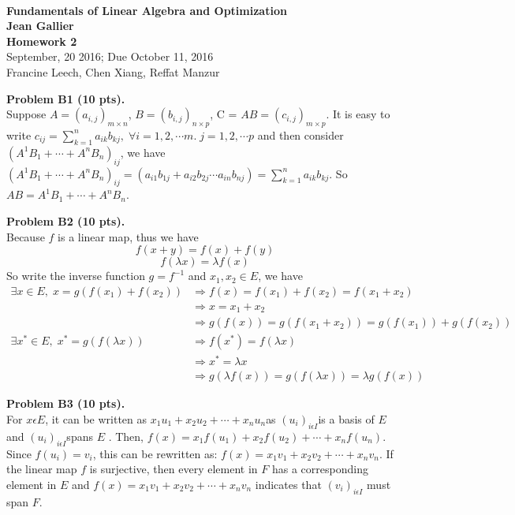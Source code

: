 \documentclass[12pt]{article}
\begin{document}
\begin{center}
\\
\vspace{1cm}
{\Large\bf Fundamentals of Linear Algebra and Optimization\\
Jean Gallier \\
\vspace{0.5cm}
Homework 2}\\[10pt]
September, 20 2016; Due October 11, 2016\\
Francine Leech, Chen Xiang, Reffat Manzur
\end{center}


\vspace {0.25cm}\noindent
{\bf Problem B1 (10 pts).} \\
Suppose $A = (a_{i,j})_{m \times n}$, $B = (b_{i,j})_{n \times p}$, C = $AB = (c_{i,j})_{m \times p}$.
It is easy to write $c_{ij} = \sum_{k=1}^{n} a_{ik} b_{kj},\; \forall i = 1,2,\cdots m.\; j = 1,2,\cdots p$ 
and then consider $(A^1B_1 + \cdots + A^nB_n)_{ij}$, we have $  (A^1B_1 + \cdots + A^nB_n)_{ij} = (a_{i1}b_{1j} + a_{i2}b_{2j} \cdots a_{in}b_{nj}) = \sum_{k=1}^{n} a_{ik} b_{kj}$. So $AB = A^1B_1 + \cdots + A^nB_n$.


\vspace {0.25cm}\noindent
{\bf Problem B2 (10 pts).} \\
Because $f$ is a linear map, thus we have 
\[
f(x + y) = f(x) + f(y)
\]
\[
f(\lambda x) = \lambda f(x)
\]
So write the inverse function $g = f^{-1}$ and $x_1,x_2 \in E$, we have 
\begin{align*}
\exists x \in E , \; x = g(f(x_1) + f(x_2)) &\Rightarrow 
f(x) = f(x_1) + f(x_2) = f(x_1 + x_2) \\
&\Rightarrow x = x_1 + x_2 \\
&\Rightarrow g(f(x)) = g(f(x_1 + x_2)) = g(f(x_1)) + g(f(x_2)) \\
\exists x^* \in E, \; x^* = g(f(\lambda x)) &\Rightarrow f(x^*) = f(\lambda x) \\
&\Rightarrow x^* = \lambda x \\
&\Rightarrow g(\lambda f(x)) = g(f(\lambda x)) = \lambda g(f(x))
\end{align*}



\vspace {0.25cm}\noindent
{\bf Problem B3 (10 pts).} \\
For $x\epsilon E$, it can be written as $x_{1}u_{1}+x_{2}u_{2}+\cdots+x_{n}u_{n}$as
$(u_{i})_{i\epsilon I}$is a basis of $E$ and $(u_{i})_{i\epsilon I}$spans
$E$ . Then, $f(x)=x_{1}f(u_{1})+x_{2}f(u_{2})+\cdots+x_{n}f(u_{n})$.
Since $f(u_{i})=v_{i}$, this can be rewritten as: $f(x)=x_{1}v_{1}+x_{2}v_{2}+\cdots+x_{n}v_{n}$.
If the linear map $f$ is surjective, then every element in $F$ has
a corresponding element in $E$ and $f(x)=x_{1}v_{1}+x_{2}v_{2}+\cdots+x_{n}v_{n}$
indicates that $(v_{i})_{i\epsilon I}$ must span $F$.\\
\end{document}
